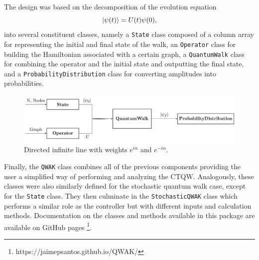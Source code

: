 \documentclass[main.tex]{subfiles}
\begin{document}
The design was based on the decomposition of the evolution equation
\begin{equation}
    \ket{\psi(t)} = U(t) \psi(0),
\end{equation}
into several constituent classes, namely a \texttt{State} class composed of a
column array for representing the initial and final state of the walk, an
\texttt{Operator} class for building the Hamiltonian associated with a certain
graph, a \texttt{QuantumWalk} class for combining the operator and the initial
state and outputting the final state, and a \texttt{ProbabilityDistribution}
class for converting amplitudes into probabilities.\par
\begin{figure}[!h]
    \centering
    \includegraphics[width=12cm]{img/QWAK/qwakDiagram.jpg}
    \caption{Directed infinite line with weights $e^{i\alpha}$ and $e^{-i\alpha}$.}
    \label{fig:oriented_line}
\end{figure}

Finally, the \texttt{QWAK} class combines all of the previous components
providing the user a simplified way of performing and analyzing the CTQW.
Analogously, these classes were also similarly defined for the stochastic
quantum walk case, except for the \texttt{State} class. They then culminate in
the \texttt{StochasticQWAK} class which performs a similar role as the
controller but with different inputs and calculation methods. Documentation on
the classes and methods available in this package are available on GitHub pages
\footnote{https://jaimepsantos.github.io/QWAK/}. 

\end{document}
